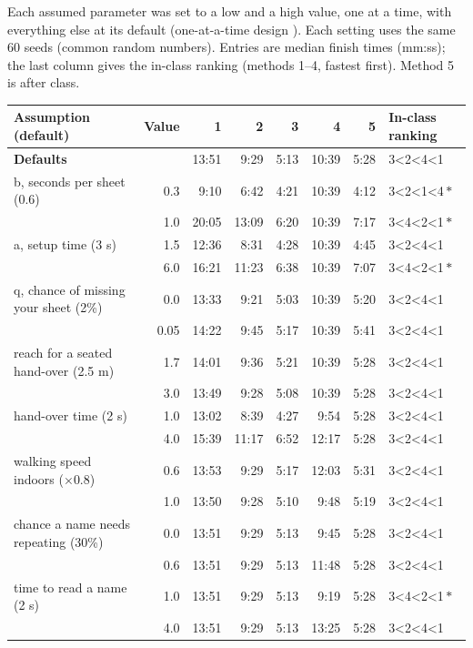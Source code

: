 Each assumed parameter was set to a low and a high value, one at a time, with everything else at its default (one-at-a-time design \cite{saltelli2008}).
Each setting uses the same 60 seeds (common random numbers). Entries are median finish times (mm:ss); the last column gives the in-class ranking (methods 1--4, fastest first). Method 5 is after class.

{\small\setlength{\tabcolsep}{4pt}
\begin{table}[htbp]\centering\footnotesize
\begin{tabular}{lrrrrrrl}
\toprule
Assumption (default) & Value & 1 & 2 & 3 & 4 & 5 & In-class ranking \\
\midrule
\textbf{Defaults} &  & 13:51 & 9:29 & 5:13 & 10:39 & 5:28 & 3<2<4<1 \\
b, seconds per sheet (0.6) & 0.3 & 9:10 & 6:42 & 4:21 & 10:39 & 4:12 & 3<2<1<4\,$\ast$ \\
 & 1.0 & 20:05 & 13:09 & 6:20 & 10:39 & 7:17 & 3<4<2<1\,$\ast$ \\
a, setup time (3 s) & 1.5 & 12:36 & 8:31 & 4:28 & 10:39 & 4:45 & 3<2<4<1 \\
 & 6.0 & 16:21 & 11:23 & 6:38 & 10:39 & 7:07 & 3<4<2<1\,$\ast$ \\
q, chance of missing your sheet (2\%) & 0.0 & 13:33 & 9:21 & 5:03 & 10:39 & 5:20 & 3<2<4<1 \\
 & 0.05 & 14:22 & 9:45 & 5:17 & 10:39 & 5:41 & 3<2<4<1 \\
reach for a seated hand-over (2.5 m) & 1.7 & 14:01 & 9:36 & 5:21 & 10:39 & 5:28 & 3<2<4<1 \\
 & 3.0 & 13:49 & 9:28 & 5:08 & 10:39 & 5:28 & 3<2<4<1 \\
hand-over time (2 s) & 1.0 & 13:02 & 8:39 & 4:27 & 9:54 & 5:28 & 3<2<4<1 \\
 & 4.0 & 15:39 & 11:17 & 6:52 & 12:17 & 5:28 & 3<2<4<1 \\
walking speed indoors ($\times$0.8) & 0.6 & 13:53 & 9:29 & 5:17 & 12:03 & 5:31 & 3<2<4<1 \\
 & 1.0 & 13:50 & 9:28 & 5:10 & 9:48 & 5:19 & 3<2<4<1 \\
chance a name needs repeating (30\%) & 0.0 & 13:51 & 9:29 & 5:13 & 9:45 & 5:28 & 3<2<4<1 \\
 & 0.6 & 13:51 & 9:29 & 5:13 & 11:48 & 5:28 & 3<2<4<1 \\
time to read a name (2 s) & 1.0 & 13:51 & 9:29 & 5:13 & 9:19 & 5:28 & 3<4<2<1\,$\ast$ \\
 & 4.0 & 13:51 & 9:29 & 5:13 & 13:25 & 5:28 & 3<2<4<1 \\

\end{tabular}
\end{table}}
